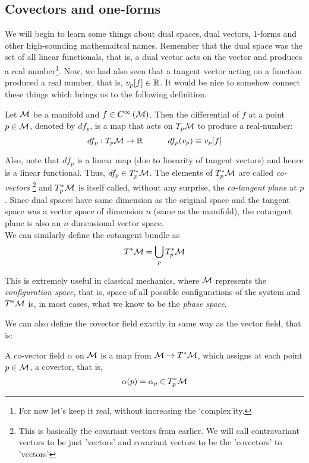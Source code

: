 \subsection{Covectors and one-forms}
We will begin to learn some things about dual spaces, dual vectors, 1-forms and other high-sounding mathemaitcal names. Remember that the dual space was the set of all linear functionals, that is, a dual vector acts on the vector and produces a real number\footnote{For now let's keep it real, without increasing the `complex'ity.}. Now, we had also seen that a tangent vector acting on a function produced a real number, that is, $v_p[f]\in \mathbb{R}$. It would be nice to somehow connect these things which brings us to the following definition. 
\begin{definition}
    Let $\mathcal M$ be a manifold and $f\in C^{\infty}\left(\mathcal M\right)$.  Then the differential of $f$ at a point $p\in\mathcal M$, denoted by $df_p$, is a map that acts on $T_p\mathcal M$ to produce a real-number:
    $$df_p:T_p\mathcal M\rightarrow \mathbb{R}\quad\quad\quad df_p(v_p) \equiv v_p[f]$$
\end{definition}
Also, note that $df_p$ is a linear map (due to linearity of tangent vectors) and hence is a linear functional. Thus, $df_p\in T_p^*\mathcal M$. The elements of $T_p^*\mathcal M$ are called \textit{co-vectors} \footnote{This is basically the covariant vectors from earlier. We will call contravariant vectors to be just 'vectors' and covariant vectors to be the 'covectors' to 'vectors'} and $T_p^*\mathcal M$ is itself called, without any surprise, the \textit{co-tangent plane} at $p$. Since dual spaces have same dimension as the original space and the tangent space was a vector space of dimension $n$ (same as the manifold), the cotangent plane is also an $n$ dimensional vector space.\\[0.2cm]
We can similarly define the cotangent bundle as 
$$T^*\mathcal M = \bigcup\limits_p T^*_p\mathcal M$$
\begin{ffact}
This is extremely useful in classical mechanics, where $\mathcal M$ represents the \textit{configuration space}, that is, space of all possible configurations of the system and $T^*\mathcal M$ is, in most cases, what we know to be the \textit{phase space}.
\end{ffact}
We can also define the covector field exactly in same way as the vector field, that is:
\begin{definition}
    A co-vector field $\alpha$ on $\mathcal M$ is a map from $\mathcal M \rightarrow T^*\mathcal M$, which assigns at each point $p\in\mathcal M$, a covector, that is,
    $$\alpha(p) = \alpha_p\in T_p^*\mathcal M$$
\end{definition}
